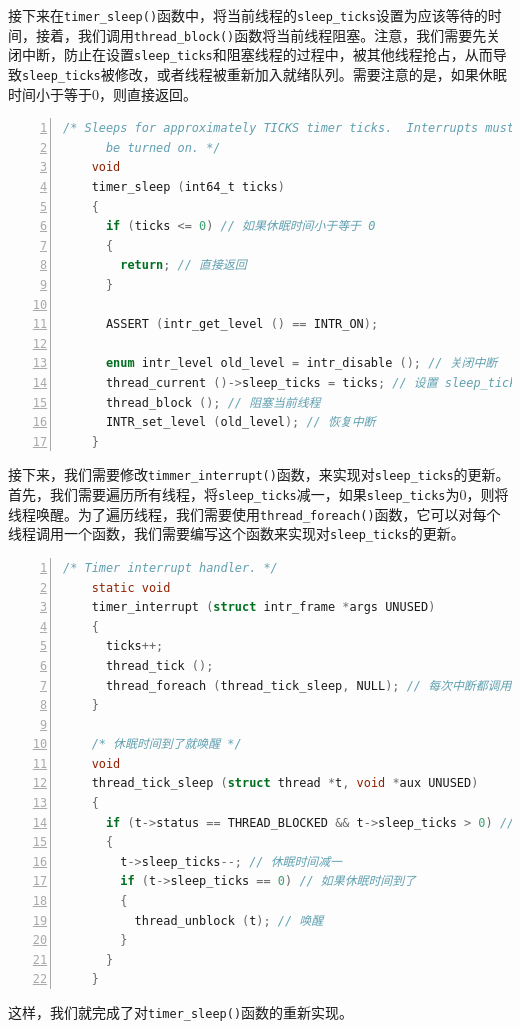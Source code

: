 \documentclass{article}
\begin{document}
接下来在\texttt{timer\_sleep()}函数中，将当前线程的\texttt{sleep\_ticks}设置为应该等待的时间，接着，我们调用\texttt{thread\_block()}函数将当前线程阻塞。注意，我们需要先关闭中断，防止在设置\texttt{sleep\_ticks}和阻塞线程的过程中，被其他线程抢占，从而导致\texttt{sleep\_ticks}被修改，或者线程被重新加入就绪队列。需要注意的是，如果休眠时间小于等于0，则直接返回。

\begin{lstlisting}[xleftmargin = 4em,xrightmargin = 4em, aboveskip = 1em, numbers = left, language = C, title=修改后的\texttt{timer\_sleep()}函数]
    /* Sleeps for approximately TICKS timer ticks.  Interrupts must
      be turned on. */
    void
    timer_sleep (int64_t ticks) 
    {
      if (ticks <= 0) // 如果休眠时间小于等于 0
      {
        return; // 直接返回
      }

      ASSERT (intr_get_level () == INTR_ON);
      
      enum intr_level old_level = intr_disable (); // 关闭中断
      thread_current ()->sleep_ticks = ticks; // 设置 sleep_ticks
      thread_block (); // 阻塞当前线程
      INTR_set_level (old_level); // 恢复中断
    }
\end{lstlisting}

接下来，我们需要修改\texttt{timmer\_interrupt()}函数，来实现对\texttt{sleep\_ticks}的更新。首先，我们需要遍历所有线程，将\texttt{sleep\_ticks}减一，如果\texttt{sleep\_ticks}为0，则将线程唤醒。为了遍历线程，我们需要使用\texttt{thread\_foreach()}函数，它可以对每个线程调用一个函数，我们需要编写这个函数来实现对\texttt{sleep\_ticks}的更新。

\begin{lstlisting}[xleftmargin = 4em,xrightmargin = 3em, aboveskip = 1em, numbers = left, language = C, title=修改后的\texttt{timmer\_interrupt()}函数]
    /* Timer interrupt handler. */
    static void
    timer_interrupt (struct intr_frame *args UNUSED)
    {
      ticks++;
      thread_tick ();
      thread_foreach (thread_tick_sleep, NULL); // 每次中断都调用 
    }
    
    /* 休眠时间到了就唤醒 */
    void
    thread_tick_sleep (struct thread *t, void *aux UNUSED)
    {
      if (t->status == THREAD_BLOCKED && t->sleep_ticks > 0) // 如果休眠时间大于 0
      {
        t->sleep_ticks--; // 休眠时间减一
        if (t->sleep_ticks == 0) // 如果休眠时间到了
        {
          thread_unblock (t); // 唤醒
        }
      }
    }
\end{lstlisting}

这样，我们就完成了对\texttt{timer\_sleep()}函数的重新实现。
\end{document}
